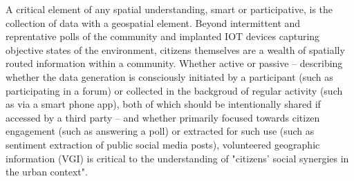A critical element of any spatial understanding, smart or participative, is the collection of data with a geospatial element. Beyond intermittent and reprentative polls of the community and implanted IOT devices capturing objective states of the environment, citizens themselves are a wealth of spatially routed information within a community\cite{Roche2012}. %
Whether active or passive -- describing whether the data generation is consciously initiated by a participant (such as participating in a forum) or collected in the backgroud of regular activity (such as via a smart phone app), both of which should be intentionally shared if accessed by a third party -- and whether primarily focused towards citizen engagement (such as answering a poll) or extracted for such use (such as sentiment extraction of public social media posts), volunteered geographic information (VGI) is critical to the understanding of "citizens' social synergies in the urban context"\cite{Acedo2019, Evans-Cowley2010}. %
